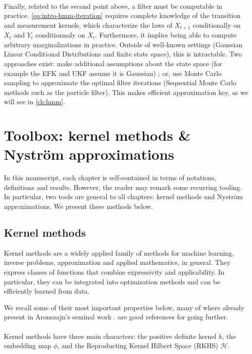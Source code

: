 \paragraph{} Finally, related to the second point above, a filter must be computable in practice. \cref{eq:intro-hmm-iteration} requires complete knowledge of the transition and measurement kernels, which characterize the laws of $X_{t+1}$ conditionally on $X_t$ and $Y_t$ conditionnaly on $X_t$. Furthermore, it implies being able to compute arbitrary marginalizations in practice. Outside of well-known settings (Gaussian Linear Conditional Distributions and finite state space), this is intractable. Two approaches exist: make additional assumptions about the state space (for example the EFK and UKF assume it is Gaussian) ; or, use Monte Carlo sampling to approximate the optimal filter iterations (Sequential Monte Carlo methods such as the particle filter). This makes efficient approximation key, as we will see in \cref{ch:hmm}.



\section{Toolbox: kernel methods \& Nyström approximations}\label{sec:tools}
In this manuscript, each chapter is self-contained in terms of notations, definitions and results. However, the reader may remark some recurring tooling. In particular, two tools are general to all chapters: kernel methods and Nyström approximations. We present these methods below.

\subsection{Kernel methods}
Kernel methods are a widely applied family of methods for machine learning, inverse problems, approximation and applied mathematics, in general. They express classes of functions that combine expressivity and applicability. In particular, they can be integrated into optimization methods and can be efficiently learned from data.

We recall some of their most important properties below, many of where already present in Aronszajn's seminal work \cite{aronszajn1950theory}. \cite{shawe-taylor2004,scholkopf-kernels} are good references for going further.

\paragraph{}
Kernel methods have three main characters: the positive definite kernel $k$, the embedding map $\phi$, and the Reproducting Kernel Hilbert Space (RKHS) $\mathcal H$.


